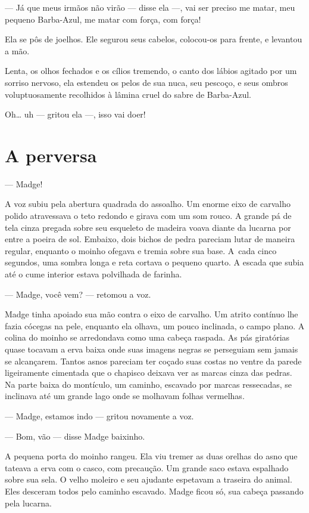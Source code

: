 --- Já que meus irmãos não virão --- disse ela ---, vai ser preciso me matar,
meu pequeno Barba-Azul, me matar com força, com força!

Ela se pôs de joelhos. Ele segurou seus cabelos, colocou-os para
frente, e levantou a mão.

Lenta, os olhos fechados e os cílios tremendo, o canto dos lábios
agitado por um sorriso nervoso, ela estendeu os pelos de sua nuca, seu
pescoço, e seus ombros voluptuosamente recolhidos à lâmina cruel do sabre de
Barba-Azul.

Oh\ldots{} uh --- gritou ela ---, isso vai doer!

\section{A perversa}

--- Madge!

A voz subiu pela abertura quadrada do assoalho. Um enorme eixo de carvalho
polido atravessava o teto redondo e girava com um som rouco. A grande pá
de tela cinza pregada sobre seu esqueleto de madeira voava diante da
lucarna por entre a poeira de sol. Embaixo, dois bichos de pedra pareciam
lutar de maneira regular, enquanto o moinho ofegava e tremia sobre sua
base. \mbox{A cada} cinco segundos, uma sombra longa e reta cortava o pequeno
quarto. A escada que subia até o cume interior estava polvilhada de
farinha.

--- Madge, você vem? --- retomou a voz.

Madge tinha apoiado sua mão contra o eixo de carvalho. Um atrito
contínuo lhe fazia cócegas na pele, enquanto ela olhava, um pouco
inclinada, o campo plano. A colina do moinho se arredondava como uma
cabeça raspada. As pás giratórias quase tocavam a erva baixa onde suas
imagens negras se perseguiam sem jamais se alcançarem. Tantos asnos
pareciam ter coçado suas costas no ventre da parede ligeiramente cimentada
que o chapisco deixava ver as marcas cinza das pedras. Na parte baixa do
montículo, um caminho, escavado por marcas ressecadas, se inclinava até um
grande lago onde se molhavam folhas vermelhas.

--- Madge, estamos indo --- gritou novamente a voz.

--- Bom, vão --- disse Madge baixinho.

A pequena porta do moinho rangeu. Ela viu tremer as duas orelhas do
asno que tateava a erva com o casco, com precaução. Um grande saco estava
espalhado sobre sua sela. O velho moleiro e seu ajudante espetavam a
traseira do animal. Eles desceram todos pelo caminho escavado. Madge ficou
só, sua cabeça passando pela lucarna.

